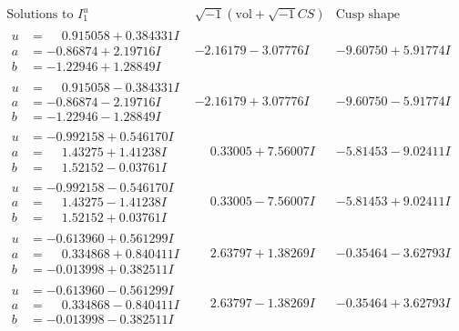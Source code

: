 \documentclass[1p]{elsarticle_modified}
\theoremstyle{definition}
\newcommand{\I}{\sqrt{-1}}
\begin{document}
$$\begin{array}{c|c|c}  
\text{Solutions to }I^u_{1}& \I (\text{vol} + \sqrt{-1}CS) & \text{Cusp shape}\\
 \hline 
\begin{aligned}
u &= \phantom{-}0.915058 + 0.384331 I \\
a &= -0.86874 + 2.19716 I \\
b &= -1.22946 + 1.28849 I\end{aligned}
 & -2.16179 - 3.07776 I & -9.60750 + 5.91774 I \\ \hline\begin{aligned}
u &= \phantom{-}0.915058 - 0.384331 I \\
a &= -0.86874 - 2.19716 I \\
b &= -1.22946 - 1.28849 I\end{aligned}
 & -2.16179 + 3.07776 I & -9.60750 - 5.91774 I \\ \hline\begin{aligned}
u &= -0.992158 + 0.546170 I \\
a &= \phantom{-}1.43275 + 1.41238 I \\
b &= \phantom{-}1.52152 - 0.03761 I\end{aligned}
 & \phantom{-}0.33005 + 7.56007 I & -5.81453 - 9.02411 I \\ \hline\begin{aligned}
u &= -0.992158 - 0.546170 I \\
a &= \phantom{-}1.43275 - 1.41238 I \\
b &= \phantom{-}1.52152 + 0.03761 I\end{aligned}
 & \phantom{-}0.33005 - 7.56007 I & -5.81453 + 9.02411 I \\ \hline\begin{aligned}
u &= -0.613960 + 0.561299 I \\
a &= \phantom{-}0.334868 + 0.840411 I \\
b &= -0.013998 + 0.382511 I\end{aligned}
 & \phantom{-}2.63797 + 1.38269 I & -0.35464 - 3.62793 I \\ \hline\begin{aligned}
u &= -0.613960 - 0.561299 I \\
a &= \phantom{-}0.334868 - 0.840411 I \\
b &= -0.013998 - 0.382511 I\end{aligned}
 & \phantom{-}2.63797 - 1.38269 I & -0.35464 + 3.62793 I \\ \hline\begin{aligned}

\end{aligned}
\end{array}$$
\end{document}
